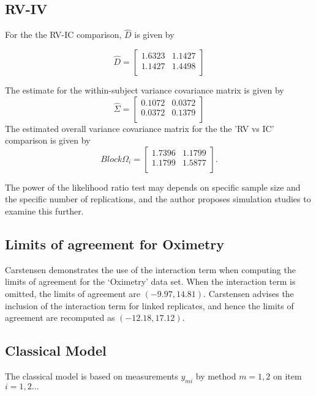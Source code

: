\documentclass[12pt, a4paper]{report}
\theoremstyle{plain}
\theoremstyle{definition}
\theoremstyle{remark}
\begin{document}
	
	\subsection{RV-IV}
For the the RV-IC comparison, $\hat{D}$ is given by


\begin{equation}
\hat{D}= \left[ \begin{array}{cc}
1.6323 & 1.1427  \\
1.1427 & 1.4498 \\
\end{array} \right]
\end{equation}

The estimate for the within-subject variance covariance matrix is
given by
\begin{equation}
\hat{\Sigma}= \left[ \begin{array}{cc}
0.1072 & 0.0372  \\
0.0372 & 0.1379  \\
\end{array}\right]
\end{equation}
The estimated overall variance covariance matrix for the the 'RV
vs IC' comparison is given by
\begin{equation}
Block \Omega_{i}= \left[ \begin{array}{cc}
1.7396 & 1.1799  \\
1.1799 & 1.5877  \\
\end{array} \right].
\end{equation}

The power of the
likelihood ratio test may depends on specific sample size and the
specific number of  replications, and the author proposes
simulation studies to examine this further.



\subsection{Limits of agreement for Oximetry}

Carstensen demonstrates the use of the interaction term when computing the limits of agreement for the `Oximetry' data set. When the interaction term is omitted, the limits of agreement are $(-9.97, 14.81)$. Carstensen advises the inclusion of the interaction term for linked replicates, and hence the limits of agreement are recomputed as $(-12.18,17.12)$.

\subsection{Classical Model}
The classical model is based on measurements $y_{mi}$
by method $m=1,2$ on item $i = 1,2 \ldots$
\end{document}

